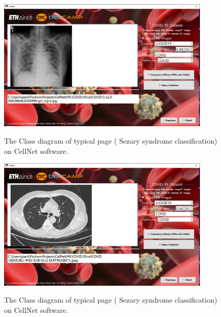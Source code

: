 \begin{figure}[t]
\begin{center}
\includegraphics[height=0.3\textheight,width=0.9\textwidth]{thesis-template-master/images/cellnet4-3page.PNG}
\label{fig:cellnet}
\end{center}
\caption{ The Class diagram of typical page ( Sezary syndrome classification) on CellNet software.}
\end{figure}



\begin{figure}[t]
\begin{center}
\includegraphics[height=0.35\textheight,width=0.9\textwidth]{thesis-template-master/images/cellnet4-4page.PNG}
\label{fig:cellnet}
\end{center}
\caption{ The Class diagram of typical page ( Sezary syndrome classification) on CellNet software. }
\end{figure}



